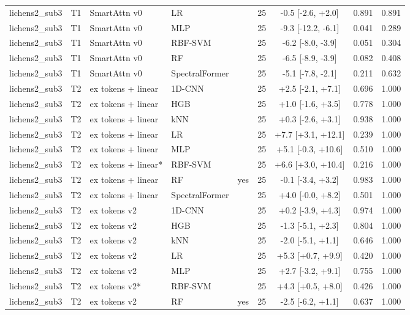 \begin{tabular}{lllllcccc}
lichens2_sub3 & T1 & SmartAttn v0 & LR &  & 25 & -0.5 [-2.6, +2.0] & 0.891 & 0.891 \\
lichens2_sub3 & T1 & SmartAttn v0 & MLP &  & 25 & -9.3 [-12.2, -6.1] & 0.041 & 0.289 \\
lichens2_sub3 & T1 & SmartAttn v0 & RBF-SVM &  & 25 & -6.2 [-8.0, -3.9] & 0.051 & 0.304 \\
lichens2_sub3 & T1 & SmartAttn v0 & RF &  & 25 & -6.5 [-8.9, -3.9] & 0.082 & 0.408 \\
lichens2_sub3 & T1 & SmartAttn v0 & SpectralFormer &  & 25 & -5.1 [-7.8, -2.1] & 0.211 & 0.632 \\
lichens2_sub3 & T2 & ex tokens + linear & 1D-CNN &  & 25 & +2.5 [-2.1, +7.1] & 0.696 & 1.000 \\
lichens2_sub3 & T2 & ex tokens + linear & HGB &  & 25 & +1.0 [-1.6, +3.5] & 0.778 & 1.000 \\
lichens2_sub3 & T2 & ex tokens + linear & kNN &  & 25 & +0.3 [-2.6, +3.1] & 0.938 & 1.000 \\
lichens2_sub3 & T2 & ex tokens + linear & LR &  & 25 & +7.7 [+3.1, +12.1] & 0.239 & 1.000 \\
lichens2_sub3 & T2 & ex tokens + linear & MLP &  & 25 & +5.1 [-0.3, +10.6] & 0.510 & 1.000 \\
lichens2_sub3 & T2 & ex tokens + linear* & RBF-SVM &  & 25 & +6.6 [+3.0, +10.4] & 0.216 & 1.000 \\
lichens2_sub3 & T2 & ex tokens + linear & RF & yes & 25 & -0.1 [-3.4, +3.2] & 0.983 & 1.000 \\
lichens2_sub3 & T2 & ex tokens + linear & SpectralFormer &  & 25 & +4.0 [-0.0, +8.2] & 0.501 & 1.000 \\
lichens2_sub3 & T2 & ex tokens v2 & 1D-CNN &  & 25 & +0.2 [-3.9, +4.3] & 0.974 & 1.000 \\
lichens2_sub3 & T2 & ex tokens v2 & HGB &  & 25 & -1.3 [-5.1, +2.3] & 0.804 & 1.000 \\
lichens2_sub3 & T2 & ex tokens v2 & kNN &  & 25 & -2.0 [-5.1, +1.1] & 0.646 & 1.000 \\
lichens2_sub3 & T2 & ex tokens v2 & LR &  & 25 & +5.3 [+0.7, +9.9] & 0.420 & 1.000 \\
lichens2_sub3 & T2 & ex tokens v2 & MLP &  & 25 & +2.7 [-3.2, +9.1] & 0.755 & 1.000 \\
lichens2_sub3 & T2 & ex tokens v2* & RBF-SVM &  & 25 & +4.3 [+0.5, +8.0] & 0.426 & 1.000 \\
lichens2_sub3 & T2 & ex tokens v2 & RF & yes & 25 & -2.5 [-6.2, +1.1] & 0.637 & 1.000 \\

\end{tabular}
